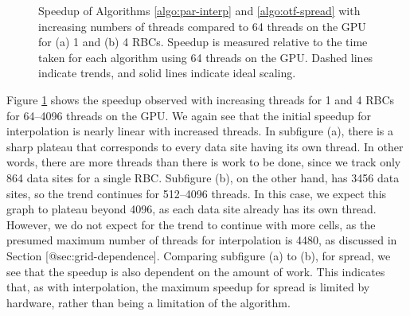 \begin{figure}[ht]
\caption{%
    Speedup of Algorithms \ref{algo:par-interp} and \ref{algo:otf-spread} with
    increasing numbers of threads compared to 64 threads on the GPU for (a) 1
    and (b) 4 RBCs. Speedup is measured relative to the time taken for each
    algorithm using 64 threads on the GPU. Dashed lines indicate trends, and
    solid lines indicate ideal scaling.
}
\label{fig:str-strong}
\end{figure}

Figure \ref{fig:str-strong} shows the speedup observed with increasing threads
for 1 and 4 RBCs for 64--4096 threads on the GPU. We again see that the initial
speedup for interpolation is nearly linear with increased threads. In subfigure
(a), there is a sharp plateau that corresponds to every data site having its
own thread. In other words, there are more threads than there is work to be
done, since we track only 864 data sites for a single RBC. Subfigure (b), on
the other hand, has 3456 data sites, so the trend continues for 512--4096
threads. In this case, we expect this graph to plateau beyond 4096, as each
data site already has its own thread. However, we do not expect for the trend
to continue with more cells, as the presumed maximum number of threads for
interpolation is 4480, as discussed in Section [@sec:grid-dependence]. 
Comparing subfigure (a) to (b), for spread, we see that the speedup is also
dependent on the amount of work. This indicates that, as with interpolation,
the maximum speedup for spread is limited by hardware, rather than being a
limitation of the algorithm.


